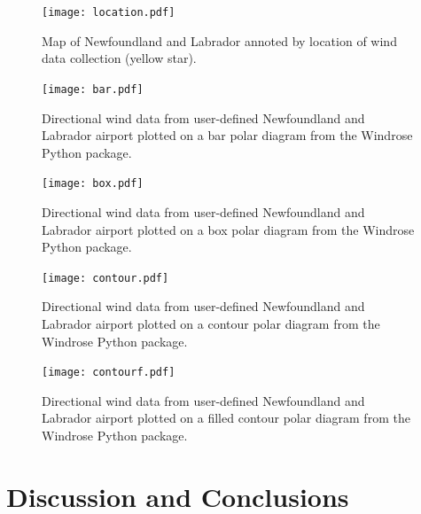 \documentclass{article}
\begin{document}
\begin{figure}[h!]                                                                                                                                                                                                 
\centering                                                                                                                                                                                                         
\texttt{[image: location.pdf]}                                                                                                                                                                                                
\caption{Map of Newfoundland and Labrador annoted by location of wind data collection (yellow star).}
\label{location}                                                                                                              
\end{figure} 
  
\begin{figure}[h!]
\centering
\texttt{[image: bar.pdf]}
\caption{Directional wind data from user-defined Newfoundland and Labrador airport plotted on a bar polar diagram from the Windrose Python package.}
\label{bar}
\end{figure}

\begin{figure}[h!]
\centering
\texttt{[image: box.pdf]}
\caption{Directional wind data from user-defined Newfoundland and Labrador airport plotted on a box polar diagram from the Windrose Python package.}
\label{box}
\end{figure}

\begin{figure}[h!]
\centering
\texttt{[image: contour.pdf]}
\caption{Directional wind data from user-defined Newfoundland and Labrador airport plotted on a contour polar diagram from the Windrose Python package.}
\label{contour}
\end{figure}

\begin{figure}[h!]
\centering
\texttt{[image: contourf.pdf]}
\caption{Directional wind data from user-defined Newfoundland and Labrador airport plotted on a filled contour polar diagram from the Windrose Python package.}
\label{contourf}
\end{figure}

\section{Discussion and Conclusions}\label{Discussion_and_conclusions}


\clearpage 


\end{document}
